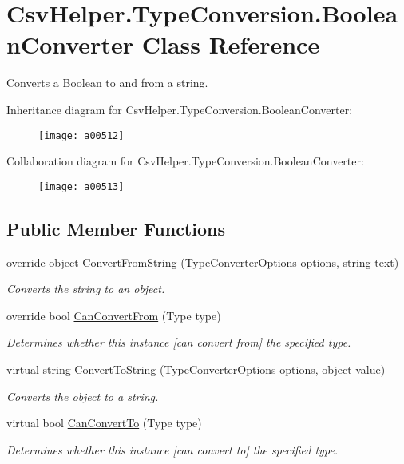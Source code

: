 \hypertarget{a00047}{\section{Csv\-Helper.\-Type\-Conversion.\-Boolean\-Converter Class Reference}
\label{a00047}
}


Converts a Boolean to and from a string.  




Inheritance diagram for Csv\-Helper.\-Type\-Conversion.\-Boolean\-Converter\-:
\nopagebreak
\begin{figure}[H]
\begin{center}
\leavevmode
\texttt{[image: a00512]}
\end{center}
\end{figure}


Collaboration diagram for Csv\-Helper.\-Type\-Conversion.\-Boolean\-Converter\-:
\nopagebreak
\begin{figure}[H]
\begin{center}
\leavevmode
\texttt{[image: a00513]}
\end{center}
\end{figure}
\subsection*{Public Member Functions}
\begin{DoxyCompactItemize}
\item 
override object \hyperlink{a00047_abc77c631974272fd1dfe3fe4fcc3bf28}{Convert\-From\-String} (\hyperlink{a00180}{Type\-Converter\-Options} options, string text)
\begin{DoxyCompactList}\small\item\em Converts the string to an object. \end{DoxyCompactList}\item 
override bool \hyperlink{a00047_a0be20573af4ee53409bb437125a64268}{Can\-Convert\-From} (Type type)
\begin{DoxyCompactList}\small\item\em Determines whether this instance \mbox{[}can convert from\mbox{]} the specified type. \end{DoxyCompactList}\item 
virtual string \hyperlink{a00090_a36cb2f9b24f15a671293f3a722324c27}{Convert\-To\-String} (\hyperlink{a00180}{Type\-Converter\-Options} options, object value)
\begin{DoxyCompactList}\small\item\em Converts the object to a string. \end{DoxyCompactList}\item 
virtual bool \hyperlink{a00090_acb65bd8c8199d88d5b1629ae35d18514}{Can\-Convert\-To} (Type type)
\begin{DoxyCompactList}\small\item\em Determines whether this instance \mbox{[}can convert to\mbox{]} the specified type. \end{DoxyCompactList}\end{DoxyCompactItemize}


